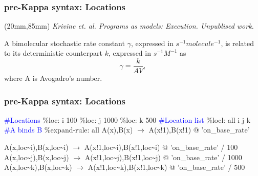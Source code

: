 \documentclass[xcolor=dvipsnames]{beamer}
\newenvironment{reference}[2]{%
    \begin{textblock*}{\textwidth}(#1,#2) 
            \footnotesize\it\bgroup\color{red!50!black}}{\egroup\end{textblock*}}
\def\int{\hbox{\texttt{\~}}}
\begin{document}
\begin{frame}
  \frametitle{pre-Kappa syntax: Locations}
  \begin{reference}{20mm}{85mm}
    Krivine et. al.  \emph{Programs as models: Execution}. Unpublised work.
  \end{reference} 
  \begin{flushleft}
    A bimolecular stochastic rate constant $\gamma$, expressed in $s^{-1} molecule^{-1}$, is related to its deterministic counterpart
    $k$, expressed in $s^{-1} M^{-1}$ as
    \begin{equation}
      \gamma = \frac{k}{AV},
    \end{equation}
    where A is Avogadro's number.
  \end{flushleft}
\end{frame}

\begin{frame}
  \frametitle{pre-Kappa syntax: Locations}
  \begin{flushleft} {\scriptsize
    \textcolor{blue}{\#Locations} \newline
    \%loc: i 100 \newline
    \%loc: j 1000 \newline
    \%loc: k 500 \newline
    \textcolor{blue}{\#Location list} \newline
    \%locl: all i j k \newline \pause
    \textcolor{blue}{\#A binds B} \newline
    \%expand-rule: all A(x),B(x) $\rightarrow$ A(x!1),B(x!1) @ 'on\_base\_rate' \pause
    \item {} \newline
    A(x,loc\int i),B(x,loc\int i) $\rightarrow$ A(x!1,loc\int i),B(x!1,loc\int i) @ 'on\_base\_rate' / 100 \newline
    A(x,loc\int j),B(x,loc\int j) $\rightarrow$ A(x!1,loc\int j),B(x!1,loc\int j) @ 'on\_base\_rate' / 1000 \newline
    A(x,loc\int k),B(x,loc\int k) $\rightarrow$ A(x!1,loc\int k),B(x!1,loc\int k) @ 'on\_base\_rate' / 500 \newline }
  \end{flushleft}
\end{frame}
\end{document}
